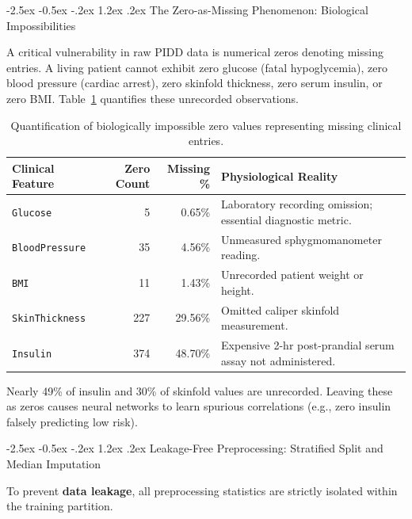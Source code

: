 \documentclass[12pt,a4paper,oneside]{report}
\makeatletter
\renewcommand\section{\@startsection {section}{1}{\z@}%
                                   {-2.5ex \@plus -0.5ex \@minus -.2ex}%
                                   {1.2ex \@plus .2ex}%
                                   {\normalfont\fontsize{13}{16}\selectfont\bfseries}}
\makeatother
\begin{document}
\section{The Zero-as-Missing Phenomenon: Biological Impossibilities}

A critical vulnerability in raw PIDD data is numerical zeros denoting missing entries. A living patient cannot exhibit zero glucose (fatal hypoglycemia), zero blood pressure (cardiac arrest), zero skinfold thickness, zero serum insulin, or zero BMI. Table~\ref{tab:missing_zeros} quantifies these unrecorded observations.

\begin{table}[htbp]
\centering
\footnotesize
\renewcommand{\arraystretch}{0.80}
\begin{tabularx}{\textwidth}{l r r X}
\toprule
\textbf{Clinical Feature} & \textbf{Zero Count} & \textbf{Missing \%} & \textbf{Physiological Reality} \\
\midrule
\texttt{Glucose} & 5 & 0.65\% & Laboratory recording omission; essential diagnostic metric. \\
\texttt{BloodPressure} & 35 & 4.56\% & Unmeasured sphygmomanometer reading. \\
\texttt{BMI} & 11 & 1.43\% & Unrecorded patient weight or height. \\
\texttt{SkinThickness} & 227 & 29.56\% & Omitted caliper skinfold measurement. \\
\texttt{Insulin} & 374 & 48.70\% & Expensive 2-hr post-prandial serum assay not administered. \\
\bottomrule
\end{tabularx}
\caption[Quantification of Biologically Impossible Zero Values]{Quantification of biologically impossible zero values representing missing clinical entries.}
\label{tab:missing_zeros}
\end{table}

Nearly 49\% of insulin and 30\% of skinfold values are unrecorded. Leaving these as zeros causes neural networks to learn spurious correlations (e.g., zero insulin falsely predicting low risk).

\section{Leakage-Free Preprocessing: Stratified Split and Median Imputation}

To prevent \textbf{data leakage}, all preprocessing statistics are strictly isolated within the training partition.
\end{document}
